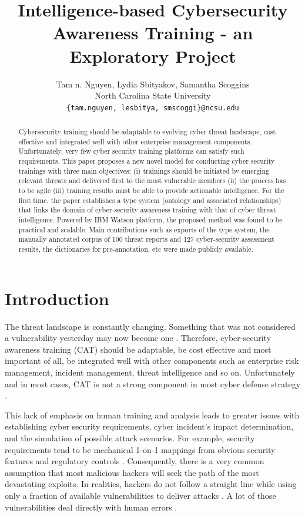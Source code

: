 \documentclass{article} %
\title{Intelligence-based Cybersecurity Awareness Training - an Exploratory Project}
\author{
Tam n. Nguyen, Lydia Sbityakov, Samantha Scoggins\\
North Carolina State University\\
\texttt{\{tam.nguyen, lesbitya, smscoggi\}@ncsu.edu} \\
}
\begin{document}
\maketitle

\begin{abstract}
  Cybersecurity training should be adaptable to evolving cyber threat landscape, cost effective and integrated well with other enterprise management components. Unfortunately, very few cyber security training platforms can satisfy such requirements. This paper proposes a new novel model for conducting cyber security trainings with three main objectives: (i) trainings should be initiated by emerging relevant threats and delivered first to the most vulnerable members (ii) the process has to be agile (iii) training results must be able to provide actionable intelligence. For the first time, the paper establishes a type system (ontology and associated relationships) that links the domain of cyber-security awareness training with that of cyber threat intelligence. Powered by IBM Watson platform, the proposed method was found to be practical and scalable. Main contributions such as exports of the type system, the manually annotated corpus of 100 threat reports and 127 cyber-security assessment results, the dictionaries for pre-annotation, etc were made publicly available.
\end{abstract}

\section{Introduction}
The threat landscape is constantly changing. Something that was not considered a vulnerability yesterday may now become one \cite{Manadhata2011AnMetric}. Therefore, cyber-security awareness training (CAT) should be adaptable, be cost effective and most important of all, be integrated well with other components such as enterprise risk management, incident management, threat intelligence and so on. Unfortunately and in most cases, CAT is not a strong component in most cyber defense strategy \cite{Jakoubi2009AManagement}.

This lack of emphasis on human training and analysis leads to greater issues with establishing cyber security requirements, cyber incident's impact determination, and the simulation of possible attack scenarios. For example, security requirements tend to be mechanical 1-on-1 mappings from obvious security features and regulatory controls \cite{Cleland-Huang2014HowGratae}. Consequently, there is a very common assumption that most malicious hackers will seek the path of the most devastating exploits. In realities, hackers do not follow a straight line while using only a fraction of available vulnerabilities to deliver attacks \cite{Allodi2017TowardsAssumptions}. A lot of those vulnerabilities deal directly with human errors \cite{Messaoud2017AdvancedChallenges}.
\end{document}
